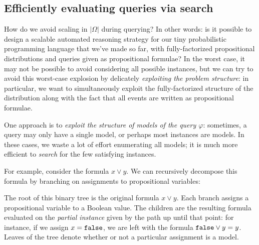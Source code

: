 \documentclass{tufte-handout}
\begin{document}
\subsection{Efficiently evaluating queries via search}
How do we avoid scaling in $|\Omega|$ during querying? 
In other words: is it possible to design a scalable automated reasoning strategy 
for our tiny probabilistic programming language that we've made so far, with fully-factorized 
propositional distributions and queries given as propositional formulae?
In the worst case, it
may not be possible to avoid considering all possible instances, but we can 
try to avoid this worst-case explosion by delicately \emph{exploiting the problem 
structure}: in particular, we want to simultaneously exploit the fully-factorized 
structure of the distribution along with the fact that all events are written 
as propositional formulae.

One approach is to \emph{exploit the structure of models of the query
$\varphi$}: sometimes, a query may only have a single model, or perhaps most
instances are models. In these cases, we waste a lot of effort enumerating all
models; it is much more efficient to \emph{search} for the few satisfying instances.

For example, consider the formula $x \lor y$. We can recursively decompose this
formula by branching on assignments to propositional variables:


The root of this binary tree is the original formula $x \lor y$. Each branch 
assigns a propositional variable to a Boolean value. The children are 
the resulting formula evaluated on the \emph{partial instance} given by the 
path up until that point: for instance, if we assign $x = \texttt{false}$, we are left 
with the formula $\texttt{false} \lor y = y$. Leaves of the tree denote whether or not a 
particular assignment is a model.\sidenote{}
\end{document}
